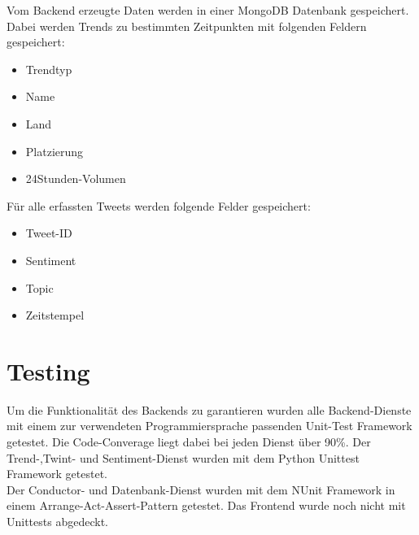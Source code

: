 \documentclass[conference]{IEEEtran}
\begin{document}
\smallskip

Vom Backend erzeugte Daten werden in einer MongoDB Datenbank gespeichert.
Dabei werden Trends zu bestimmten Zeitpunkten mit folgenden Feldern gespeichert:
\begin{itemize}
    \item Trendtyp
    \item Name
    \item Land
    \item Platzierung
    \item 24Stunden-Volumen
\end{itemize}
Für alle erfassten Tweets werden folgende Felder gespeichert:
\begin{itemize}
    \item Tweet-ID
    \item Sentiment
    \item Topic
    \item Zeitstempel
\end{itemize}

\section{Testing}
Um die Funktionalität des Backends zu garantieren wurden alle Backend-Dienste mit einem zur verwendeten Programmiersprache passenden Unit-Test Framework getestet.
Die Code-Converage liegt dabei bei jeden Dienst über 90\%.
Der Trend-,Twint- und Sentiment-Dienst wurden mit dem Python Unittest\cite{unittest} Framework getestet.\\
Der Conductor- und Datenbank-Dienst wurden mit dem NUnit\cite{nunit} Framework in einem Arrange-Act-Assert-Pattern getestet.
Das Frontend wurde noch nicht mit Unittests abgedeckt.
\end{document}
